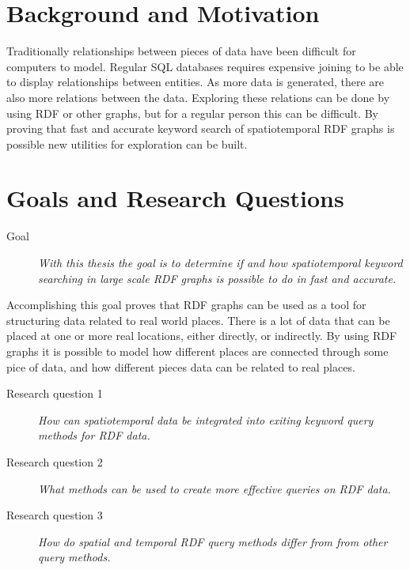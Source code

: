 \section{Background and Motivation}
\label{sec:BackgroundAndMotivation}
Traditionally relationships between pieces of data have been difficult for computers to model. Regular SQL databases requires expensive joining to be able to display relationships between entities. As more data is generated, there are also more relations between the data. Exploring these relations can be done by using RDF or other graphs, but for a regular person this can be difficult. By proving that fast and accurate keyword search of spatiotemporal RDF graphs is possible new utilities for exploration can be built.


\section{Goals and Research Questions}
\label{sec:Goals and Research Questions}
\begin{description}
    \item[Goal] {\em With this thesis the goal is to determine if and how spatiotemporal keyword searching in large scale RDF graphs is possible to do in fast and accurate.}
\end{description}
Accomplishing this goal proves that RDF graphs can be used as a tool for structuring data related to real world places. There is a lot of data that can be placed at one or more real locations, either directly, or indirectly. By using RDF graphs it is possible to model how different places are connected through some pice of data, and how different pieces data can be related to real places.

\begin{description}
    \item[Research question 1] {\em How can spatiotemporal data be integrated into exiting keyword query methods for RDF data.}
\end{description}

\begin{description}
    \item[Research question 2] {\em What methods can be used to create more effective queries on RDF data.}
\end{description}

\begin{description}
    \item[Research question 3] {\em How do spatial and temporal RDF query methods differ from from other query methods.}
\end{description}

